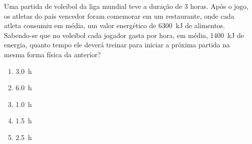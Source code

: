 Uma partida de voleibol da liga mundial teve a duração de $3$ horas.
Após o jogo, os atletas do país vencedor foram comemorar em um restaurante, onde cada atleta consumiu em média, um valor energético de \SI{6300}{\kilo\joule} de alimentos.
Sabendo-se que no voleibol cada jogador gasta por hora, em média, \SI{1400}{\kilo\joule} de energia, quanto tempo ele deverá treinar para iniciar a próxima partida na mesma forma física da anterior?

\begin{enumerate}[label = (\scalealph{\alph*})]
	\item \SI{3,0}{\hour}
	\item \SI{6,0}{\hour}
	\item \SI{1,0}{\hour}
	\item \SI{1,5}{\hour}
	\item \SI{2,5}{\hour}
\end{enumerate}
